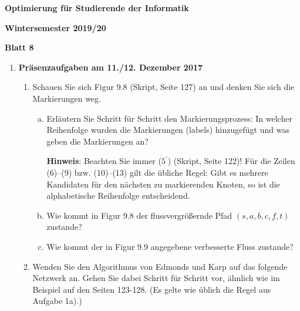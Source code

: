 \documentclass[11pt, a4paper]{article}
\begin{document}
\begin{center}
\begin{Large}
\textbf{Optimierung für Studierende der Informatik}
\end{Large}

\textbf{}
	
\vspace{0.5cm}

\textbf{Wintersemester 2019/20}

\textbf{Blatt 8}

\vspace{0.5cm}
\end{center}

\small

\begin{enumerate}[\bfseries A:]


\item \textbf{Präsenzaufgaben am 11./12. Dezember 2017}

\begin{enumerate}[\bfseries 1.]

\item Schauen Sie sich Figur 9.8 (Skript, Seite 127) an und denken Sie sich die Markierungen weg.
\begin{enumerate}[a)]
\item Erläutern Sie Schritt für Schritt den Markierungsprozess: In welcher Reihenfolge wurden die Markierungen (labels) hinzugefügt und was geben die Markierungen an?

\textbf{Hinweis}: Beachten Sie immer ($5^\prime$) (Skript, Seite 122)! Für die Zeilen (6)--(9) bzw. (10)--(13) gilt die übliche Regel: Gibt es mehrere Kandidaten für den nächsten zu markierenden Knoten, so ist die alphabetische Reihenfolge entscheidend.

\item Wie kommt in Figur 9.8 der flussvergrößernde Pfad $(s,a,b,c,f,t)$ zustande?
\item Wie kommt der in Figur 9.9 angegebene verbesserte Fluss zustande?
\end{enumerate}

\item Wenden Sie den Algorithmus von Edmonds und Karp auf das folgende Netzwerk an. Gehen Sie dabei Schritt für Schritt vor, ähnlich wie im Beispiel auf den Seiten 123-128. (Es gelte wie üblich die Regel aus Aufgabe 1a).)


\end{enumerate}
\end{enumerate}
\end{document}
